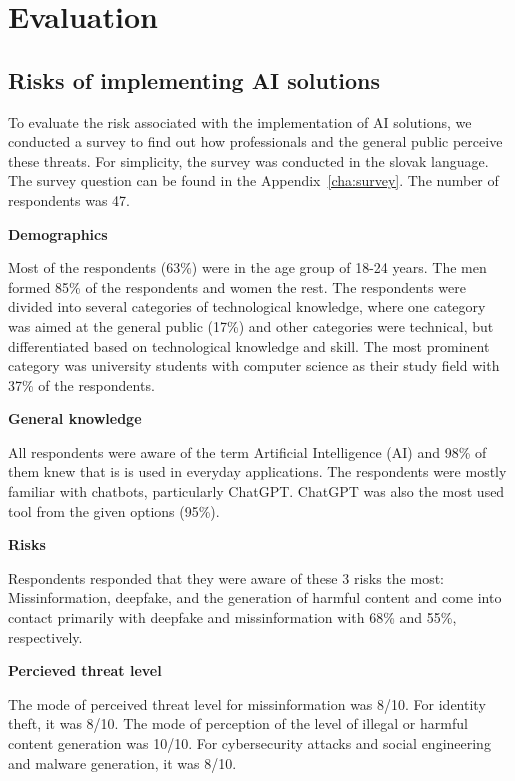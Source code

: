 \chapter{Evaluation \label{cha:eva}}

\section{Risks of implementing AI solutions \label{sec:eval_risks_survey}}
To evaluate the risk associated with the implementation of AI solutions, we conducted a survey to find out how professionals and the general public perceive these threats. For simplicity, the survey was conducted in the slovak language. The survey question can be found in the Appendix~\ref{cha:survey}. The number of respondents was 47.

\textbf{Demographics}

Most of the respondents (63\%) were in the age group of 18-24 years. The men formed 85\% of the respondents and women the rest. The respondents were divided into several categories of technological knowledge, where one category was aimed at the general public (17\%) and other categories were technical, but differentiated based on technological knowledge and skill. The most prominent category was university students with computer science as their study field with 37\% of the respondents.

\textbf{General knowledge}

All respondents were aware of the term Artificial Intelligence (AI) and 98\% of them knew that is is used in everyday applications. The respondents were mostly familiar with chatbots, particularly ChatGPT. ChatGPT was also the most used tool from the given options (95\%).

\textbf{Risks}

Respondents responded that they were aware of these 3 risks the most: Missinformation, deepfake, and the generation of harmful content and come into contact primarily with deepfake and missinformation with 68\% and 55\%, respectively.

\textbf{Percieved threat level}

The mode of perceived threat level for missinformation was 8/10.
For identity theft, it was 8/10.
The mode of perception of the level of illegal or harmful content generation was 10/10.
For cybersecurity attacks and social engineering and malware generation, it was 8/10.


